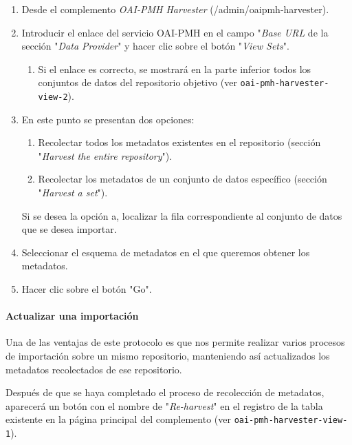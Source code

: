 \documentclass[
]{article}
\providecommand{\tightlist}{%
  \setlength{\itemsep}{0pt}\setlength{\parskip}{0pt}}
\begin{document}
\begin{enumerate}
\def\labelenumi{\arabic{enumi}.}
\item
  Desde el complemento \emph{OAI-PMH Harvester}
  ({/admin/oaipmh-harvester}).
\item
  Introducir el enlace del servicio OAI-PMH en el campo "\emph{Base URL}
  de la sección "\emph{Data Provider}" y hacer clic sobre el botón
  "\emph{View Sets}".

  \begin{enumerate}
  \def\labelenumii{\alph{enumii}.}
  \tightlist
  \item
    Si el enlace es correcto, se mostrará en la parte inferior todos los
    conjuntos de datos del repositorio objetivo (ver
    \texttt{oai-pmh-harvester-view-2}).
  \end{enumerate}
\item
  En este punto se presentan dos opciones:

  \begin{enumerate}
  \def\labelenumii{\alph{enumii}.}
  \tightlist
  \item
    Recolectar todos los metadatos existentes en el repositorio (sección
    "\emph{Harvest the entire repository}").
  \item
    Recolectar los metadatos de un conjunto de datos específico (sección
    "\emph{Harvest a set}").
  \end{enumerate}

  Si se desea la opción a, localizar la fila correspondiente al conjunto
  de datos que se desea importar.
\item
  Seleccionar el esquema de metadatos en el que queremos obtener los
  metadatos.
\item
  Hacer clic sobre el botón "Go".
\end{enumerate}

\hypertarget{actualizar-una-importaciuxf3n}{%
\paragraph{Actualizar una
importación}\label{actualizar-una-importaciuxf3n}}

Una de las ventajas de este protocolo es que nos permite realizar varios
procesos de importación sobre un mismo repositorio, manteniendo así
actualizados los metadatos recolectados de ese repositorio.

Después de que se haya completado el proceso de recolección de
metadatos, aparecerá un botón con el nombre de "\emph{Re-harvest}" en el
registro de la tabla existente en la página principal del complemento
(ver \texttt{oai-pmh-harvester-view-1}).
\end{document}
